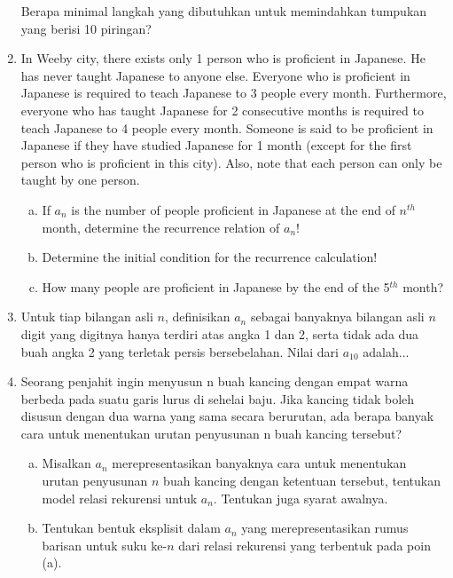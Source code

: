 \documentclass[11pt]{scrartcl}
\begin{document}
\begin{enumerate}
    Berapa minimal langkah yang dibutuhkan untuk memindahkan tumpukan yang berisi 10 piringan?

    \item In Weeby city, there exists only 1 person who is proficient in Japanese. He has never taught Japanese to anyone else. Everyone who is proficient in Japanese is required to teach Japanese to 3 people every month. Furthermore, everyone who has taught Japanese for 2 consecutive months is required to teach Japanese to 4 people every month. Someone is said to be proficient in Japanese if they have studied Japanese for 1 month (except for the first person who is proficient in this city). Also, note that each person can only be taught by one person.
    \begin{enumerate}[a.]
        \item If $a_n$ is the number of people proficient in Japanese at the end of $n^{th}$ month, determine the recurrence relation of $a_n$!
        \item Determine the initial condition for the recurrence calculation!
        \item How many people are proficient in Japanese by the end of the 5$^{th}$ month?
    \end{enumerate}
    
    
    
    \item Untuk tiap bilangan asli $n$, definisikan $a_n$ sebagai banyaknya bilangan asli $n$ digit yang digitnya hanya terdiri atas angka 1 dan 2, serta tidak ada dua buah angka 2 yang terletak persis bersebelahan. Nilai dari $a_{10}$ adalah...

    \item Seorang penjahit ingin menyusun n buah kancing dengan empat warna berbeda pada suatu garis lurus di sehelai baju. Jika kancing tidak boleh disusun dengan dua warna yang sama secara berurutan, ada berapa banyak cara untuk menentukan urutan penyusunan n buah kancing tersebut?
    \begin{enumerate}[a)]
        \item  Misalkan $a_n$ merepresentasikan banyaknya cara untuk menentukan urutan penyusunan $n$ buah kancing dengan ketentuan tersebut, tentukan model relasi rekurensi untuk $a_n$. Tentukan juga syarat awalnya.
        \item Tentukan bentuk eksplisit dalam $a_n$ yang merepresentasikan rumus barisan untuk suku ke-$n$ dari relasi rekurensi yang terbentuk pada poin (a).
    \end{enumerate}


\end{enumerate}
\end{document}
